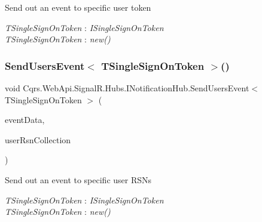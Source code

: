 Send out an event to specific user token 

\begin{Desc}
\item[Type Constraints]\begin{description}
\item[{\em T\+Single\+Sign\+On\+Token} : {\em I\+Single\+Sign\+On\+Token}]\item[{\em T\+Single\+Sign\+On\+Token} : {\em new()}]\end{description}
\end{Desc}
\mbox{\label{interfaceCqrs_1_1WebApi_1_1SignalR_1_1Hubs_1_1INotificationHub_a85206bb4c54103e9a377d34baee285a4_a85206bb4c54103e9a377d34baee285a4}} 
\subsubsection{\texorpdfstring{Send\+Users\+Event$<$ T\+Single\+Sign\+On\+Token $>$()}{SendUsersEvent< TSingleSignOnToken >()}}
{\footnotesize\ttfamily void Cqrs.\+Web\+Api.\+Signal\+R.\+Hubs.\+I\+Notification\+Hub.\+Send\+Users\+Event$<$ T\+Single\+Sign\+On\+Token $>$ (\begin{DoxyParamCaption}\item[{\hyperlink{interfaceCqrs_1_1Events_1_1IEvent}{I\+Event}$<$ T\+Single\+Sign\+On\+Token $>$}]{event\+Data,  }\item[{params Guid \mbox{[}$\,$\mbox{]}}]{user\+Rsn\+Collection }\end{DoxyParamCaption})}



Send out an event to specific user R\+S\+Ns 

\begin{Desc}
\item[Type Constraints]\begin{description}
\item[{\em T\+Single\+Sign\+On\+Token} : {\em I\+Single\+Sign\+On\+Token}]\item[{\em T\+Single\+Sign\+On\+Token} : {\em new()}]\end{description}
\end{Desc}
